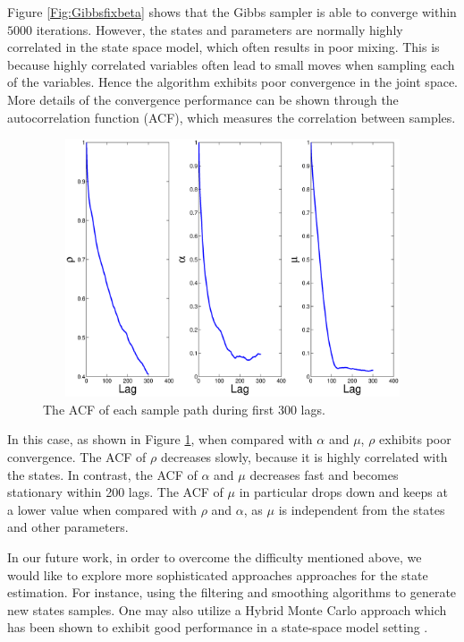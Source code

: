 \documentclass{article}
\begin{document}
Figure \ref{Fig:Gibbsfixbeta} shows that the Gibbs sampler is able to converge within $5000$ iterations.
However, the states and parameters are normally highly correlated in the state space model, which often results
in poor mixing. This is because highly correlated variables often lead to small moves when sampling each of the variables. Hence the algorithm exhibits poor convergence in the joint space. More details of the convergence performance can be shown through the autocorrelation function (ACF), which measures the correlation between samples.

\begin{figure}[ht]
	\centering
	\includegraphics[height=3in,width = 5.0in]{./Figures/fixbetaacf.eps}
	\caption{The ACF of each sample path during first 300 lags.}
	\label{Fig:Gibbsacf}
\end{figure}

In this case, as shown in Figure \ref{Fig:Gibbsacf}, when compared with $\alpha$ and $\mu$, $\rho$
exhibits poor convergence. The  ACF of $\rho$ decreases slowly, because it is highly correlated with the states. In
contrast, the ACF of $\alpha$ and $\mu$ decreases fast and becomes stationary within 200 lags.
The  ACF of $\mu$ in particular drops down and keeps at a lower value when compared with $\rho$ and $\alpha$,
as $\mu$ is independent from the states and other parameters.

In our future work, in order to overcome the difficulty mentioned above, we would like to explore more
sophisticated approaches approaches for the state estimation.
For instance, using the filtering and smoothing algorithms to generate new states samples. One may also utilize a Hybrid Monte Carlo approach which has been shown to exhibit good performance in a state-space model setting \cite{Chen_2000}.
\end{document}
